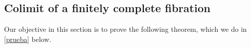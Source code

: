 \begin{comment}
\begin{remark}
Because $\cc{G}$, is cofiltered $S$ admits a calculus of right fractions  \cite{sga4}, \cite{tesemi}. Thus we can describe the category of fractions $\cc{E}[S^{-1}]$  as done in \cite{gabzis} as follows. The objects of $\cc{E}[S^{-1}]$ are the objects of $\cc{E}$. A morphism ${X \mr{} Y}$ in $\cc{E}[S^{-1}]$ is an equivalence class of the quotient set of the set of pairs  $X \ml{s} A \mr{f} Y$ with $s \in S$ where the equivalence relation is given by the relation ${X \ml{s} A \mr{f} Y \sim X \ml{s'} A' \mr{f'} Y}$ if and only if there exists ${X \ml{s''} A'' \mr{f''} Y}$ with $s'' \in S$ and arrows $A'' \mr{} A$ and $A'' \mr{} A'$ in $\cc{E}$ such that the following diagram commutes. 

\[
\xymatrix @+3ex {& A \ar[dl]_s \ar[dr]^f & \\
		  X & A'' \ar[l]_{s''} \ar[r]^{f''} \ar[u] \ar[d] & Y \\
		  & A' \ar[ul]^{s'} \ar[ur]_{f'} &}
\]

\noindent We will denote the class of the pair ${X \ml{s} A \mr{f} Y}$ by  ${X \mr{f/s} Y} $. For ${X \mr{f/s} Y \mr{g/t} Z}$ having a calculus of right fractions guarantees that there is a pair $A \ml{u} C \mr{h} B$ with $u \in S$ such that $su \in S$ and the following diagram commutes.
 
\[
\xymatrix{&& C \ar[dl]_u \ar[dr]^h && \\
		  & A \ar[dl]_s \ar[dr]^f && B \ar[dl]_t \ar[dr]^g & \\
		  X && Y && Z}
\] 
 
\noindent The operation $(g/t)(f/s):=(gh)/(su)$ is well defined, which defines the composition. The functor $Q$ is defined as the identity on objects and for ${A \mr{f} Y \in \cc{E}}$ we have $Q(f)=f/{1_A}$. For ${A \mr{s} X \in S}$, and adopting the abuse of notations $f/{1_A}=f$ and $1_A/s=1/s$,  we have that ${({1}/s) \cdot s=1_A}$, $s \cdot ({1}/s)=1_X$ and ${f/s=f\cdot ({1}/s)}$.  For details see \cite{gabzis}.
\end{remark}
\end{comment}

\subsection{Colimit of a finitely complete fibration}       
Our objective in this section is to prove the following theorem, which we do in \ref{prueba} below.

